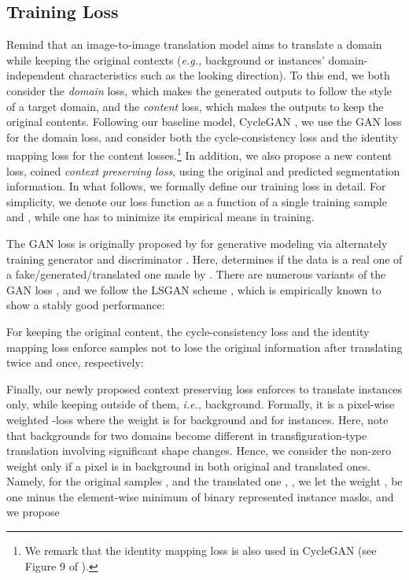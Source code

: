 \documentclass{article} \usepackage{iclr2019_conference,times}
\begin{document}
\vspace{-0.025in}
\subsection{Training Loss}
\label{sec:method-loss}
\vspace{-0.025in}

Remind that an image-to-image translation model aims to translate a domain
while keeping the original contexts (\textit{e.g.,} background or instances' domain-independent characteristics such as the looking direction).
To this end, we both consider the \textit{domain} loss, which makes the generated outputs to follow the style of a target domain,
and the \textit{content} loss, which makes the outputs to keep the original contents.
Following our baseline model, CycleGAN \citep{zhu2017unpaired},
we use the GAN loss for the domain loss, and consider both the cycle-consistency loss \citep{kim2017learning, yi2017dualgan}
and the identity mapping loss \citep{taigman2016unsupervised} for the content losses.\footnote{
We remark that the identity mapping loss is also used in CycleGAN (see Figure 9 of \citet{zhu2017unpaired}).
}
In addition, we also propose a new content loss, coined \textit{context preserving loss},
using the original and predicted segmentation information.
In what follows, we formally define our training loss in detail. For simplicity, we denote our loss function as a function of a single training sample
 and ,
while one has to minimize its empirical means in training.


The GAN loss is originally proposed by \citet{goodfellow2014generative}
for generative modeling via alternately training generator  and discriminator .
Here,  determines if the data is a real one of a fake/generated/translated one made by .
There are numerous variants of the GAN loss \citep{nowozin2016f, arjovsky2017wasserstein, li2017mmd, mroueh2017sobolev}, and we follow the LSGAN scheme \citep{mao2017least}, which is empirically known to show a stably good performance:

For keeping the original content,
the cycle-consistency loss  and 
the identity mapping loss 
enforce samples not to lose the original information
after translating twice and once, respectively:

Finally, our newly proposed context preserving loss 
enforces to translate instances only, while keeping outside of them, \textit{i.e.,} background.
Formally, it is a pixel-wise weighted -loss where the weight is
 for background and  for instances. Here, note that backgrounds for two domains become different in transfiguration-type translation involving significant shape changes. 
Hence, we consider the non-zero weight only if a pixel is in background
in both original and translated ones. Namely,  for the original samples ,  and the translated one , , we let the weight , 
be one minus
the element-wise minimum of binary represented instance masks,
and we propose
\end{document}
